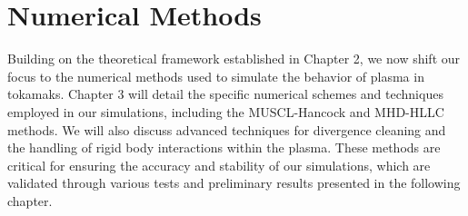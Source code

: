 
\chapter{Numerical Methods}  %

\ifpdf
    \graphicspath{{Chapter3/Figs/Raster/}{Chapter3/Figs/PDF/}{Chapter3/Figs/}}
\else
    \graphicspath{{Chapter3/Figs/Vector/}{Chapter3/Figs/}}
\fi

\label{chapter 3}

Building on the theoretical framework established in Chapter 2, we now shift our focus to the numerical methods used to simulate the behavior of plasma in tokamaks. Chapter 3 will detail the specific numerical schemes and techniques employed in our simulations, including the MUSCL-Hancock and MHD-HLLC methods. We will also discuss advanced techniques for divergence cleaning and the handling of rigid body interactions within the plasma. These methods are critical for ensuring the accuracy and stability of our simulations, which are validated through various tests and preliminary results presented in the following chapter.
